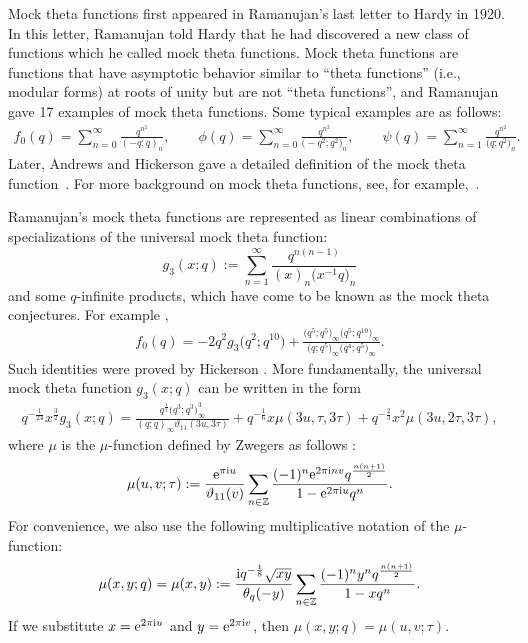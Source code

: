 \documentclass[pdftex]{sigma}
\numberwithin{equation}{section}
\theoremstyle{definition}
\newcommand{\Zz}{\mathbb{Z}}
\begin{document}
Mock theta functions first appeared in Ramanujan's last letter to Hardy in 1920.
In this letter, Ramanujan told Hardy that he had discovered a new class of functions which he called mock theta functions.
Mock theta functions are functions that have asymptotic behavior similar to ``theta functions'' (i.e., modular forms) at roots of unity but are not ``theta functions'', and Ramanujan gave 17 examples of mock theta functions.
Some typical examples are as follows:
\begin{gather*}%
f_0(q)=\sum_{n=0}^{\infty } \frac{q^{n^2}}{(-q;q)_n}, \qquad
\phi(q)=\sum_{n=0}^{\infty } \frac{q^{n^2}}{\big({-}q^2;q^2\big)_n}, \qquad
\psi(q)=\sum_{n=1}^{\infty } \frac{q^{n^2}}{\big(q;q^2\big)_n}.
\end{gather*}
Later, Andrews and Hickerson gave a detailed definition of the mock theta function~\cite{AH}. For more background on mock theta functions, see, for example,~\cite{AB,GM}.

Ramanujan's mock theta functions are represented as linear combinations of specializations of the universal mock theta function:
\[
g_3(x;q):=\sum_{n=1}^{\infty }\frac{q^{n(n-1)}}{(x)_{n }\big(x^{-1}q\big)_{n }}
\]
and some $q$-infinite products, which have come to be known as the mock theta conjectures.
For example \cite[Appendix~A]{BFOR},
\begin{gather*}
f_0(q)
 =
 -2q^{2}g_{3}\big(q^{2};q^{10}\big)+\frac{\big(q^{5};q^{5}\big)_{\infty }\big(q^{5};q^{10}\big)_{\infty }}{\big(q;q^{5}\big)_{\infty }\big(q^{4};q^{5}\big)_{\infty }}.
\end{gather*}
Such identities were proved by Hickerson \cite{H}.
More fundamentally, the universal mock theta function $g_{3}(x;q)$ can be written in the form~\cite[Theorem~3.1]{K}
\begin{gather*}
q^{-\frac{1}{24}}x^\frac{3}{2}g_3(x;q)
 =
 \frac{q^{\frac{1}{3}}\big(q^{3};q^{3}\big)_{\infty }^{3}}{(q;q)_{\infty }\vartheta_{11}(3u,3\tau)} +q^{-\frac{1}{6}}x\mu(3u,\tau,3\tau)+q^{-\frac{2}{3}}x^2\mu(3u,2\tau,3\tau),
\end{gather*}
where $\mu$ is the $\mu$-function defined by Zwegers as follows \cite{Zw1}:
\begin{gather*}
\mu(u,v;\tau)
 :=\frac{{\rm e}^{\pi{\rm i} u}}{\vartheta_{11}(v)}\sum_{n\in\Zz}\frac{(-1)^{n}{\rm e}^{2\pi{\rm i}nv}q^\frac{n(n+1)}{2}}{1-{\rm e}^{2\pi{\rm i}u}q^n}.
\end{gather*}
For convenience, we also use the following multiplicative notation of the $\mu$-function:
\begin{gather*}
\mu(x,y;q)=\mu(x,y):=\frac{{\rm i}q^{-\frac{1}{8}}\sqrt{xy}}{\theta_q(-y)}\sum_{n\in\Zz}\frac{(-1)^ny^nq^\frac{n(n+1)}{2}}{1-xq^n}.
\end{gather*}
If we substitute $x={\rm e}^{2\pi{\rm i}u}$ and $y={\rm e}^{2\pi{\rm i}v}$, then $\mu(x,y;q )=\mu(u,v;\tau )$.
\end{document}
